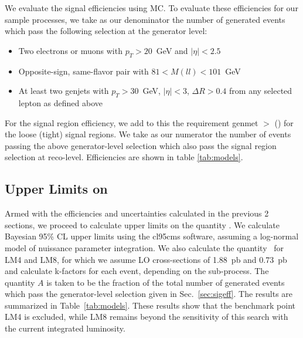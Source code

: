 We evaluate the signal efficiencies using MC. To evaluate these efficiencies for our 
sample processes, 
we take as our denominator the number of generated events which pass the following selection at
the generator level:

\begin{itemize}
\item Two electrons or muons with $p_T>20$~GeV and $|\eta|<2.5$
\item Opposite-sign, same-flavor pair with $81 < M(ll) < 101$~GeV
\item At least two genjets with $p_T > 30$~GeV, $|\eta|<3$, $\Delta R > 0.4$ from any selected lepton as defined above
\end{itemize}

For the %
signal region efficiency,
we add to this the requirement genmet
$>$ \signalmetl (\signalmett) for the loose (tight) signal regions.
We take as our numerator the number of events passing the above generator-level selection which
also pass the signal region selection at reco-level. 
Efficiencies are shown in table \ref{tab:models}.





\subsection{Upper Limits on \sta}

Armed with the efficiencies and uncertainties calculated in the previous 2 sections, we proceed
to calculate upper limits on the quantity \sta.
We calculate Bayesian 95\% CL upper
limits using the cl95cms software, assuming a log-normal model of nuissance parameter integration.
We also calculate the quantity \sta ~for LM4 and LM8, for which we assume LO
cross-sections of 1.88~pb and 0.73~pb and calculate k-factors for each event, depending on the sub-process.
The quantity $A$ is taken to be the fraction of the total number of generated events which
pass the generator-level selection given in Sec.~\ref{sec:sigeff}. The results are summarized in
Table~\ref{tab:models}. 
These results show that the benchmark point LM4 is excluded, while
LM8 remains beyond the
sensitivity of this search with the current integrated luminosity.

